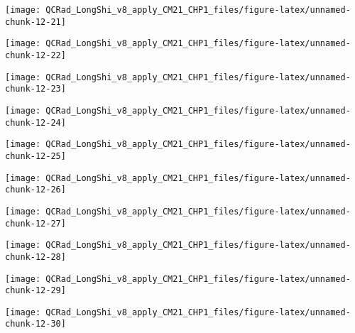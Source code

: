 \documentclass[
  10pt,
  a4paper,oneside]{article}
\begin{document}
\begin{center}\texttt{[image: QCRad\_LongShi\_v8\_apply\_CM21\_CHP1\_files/figure-latex/unnamed-chunk-12-21]} \end{center}

\begin{center}\texttt{[image: QCRad\_LongShi\_v8\_apply\_CM21\_CHP1\_files/figure-latex/unnamed-chunk-12-22]} \end{center}

\begin{center}\texttt{[image: QCRad\_LongShi\_v8\_apply\_CM21\_CHP1\_files/figure-latex/unnamed-chunk-12-23]} \end{center}

\begin{center}\texttt{[image: QCRad\_LongShi\_v8\_apply\_CM21\_CHP1\_files/figure-latex/unnamed-chunk-12-24]} \end{center}

\begin{center}\texttt{[image: QCRad\_LongShi\_v8\_apply\_CM21\_CHP1\_files/figure-latex/unnamed-chunk-12-25]} \end{center}

\begin{center}\texttt{[image: QCRad\_LongShi\_v8\_apply\_CM21\_CHP1\_files/figure-latex/unnamed-chunk-12-26]} \end{center}

\begin{center}\texttt{[image: QCRad\_LongShi\_v8\_apply\_CM21\_CHP1\_files/figure-latex/unnamed-chunk-12-27]} \end{center}

\begin{center}\texttt{[image: QCRad\_LongShi\_v8\_apply\_CM21\_CHP1\_files/figure-latex/unnamed-chunk-12-28]} \end{center}

\begin{center}\texttt{[image: QCRad\_LongShi\_v8\_apply\_CM21\_CHP1\_files/figure-latex/unnamed-chunk-12-29]} \end{center}

\begin{center}\texttt{[image: QCRad\_LongShi\_v8\_apply\_CM21\_CHP1\_files/figure-latex/unnamed-chunk-12-30]} \end{center}
\end{document}
